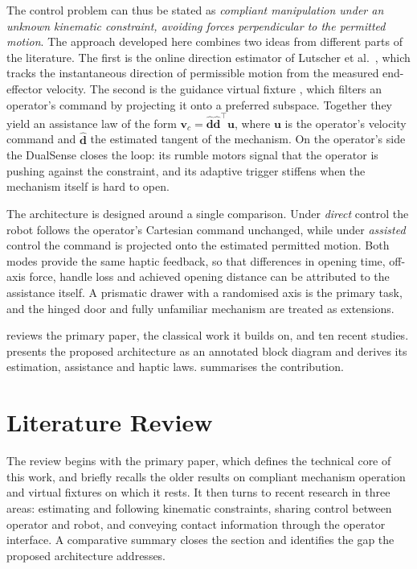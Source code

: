 \documentclass[11pt,letterpaper]{article}
\newcommand{\vect}[1]{\bm{#1}}
\newcommand{\vuser}{\vect{u}}
\newcommand{\vcmd}{\vect{v}_{c}}
\begin{document}
The control problem can thus be stated as \emph{compliant manipulation under an unknown kinematic constraint, avoiding forces perpendicular to the permitted motion}. The approach developed here combines two ideas from different parts of the literature. The first is the online direction estimator of Lutscher et al.\ \cite{lutscher2010control}, which tracks the instantaneous direction of permissible motion from the measured end-effector velocity. The second is the guidance virtual fixture \cite{rosenberg1993virtual,marayong2003spatial,abbott2003architectures}, which filters an operator's command by projecting it onto a preferred subspace. Together they yield an assistance law of the form $\vcmd = \hat{\vect{d}}\hat{\vect{d}}^{\top}\vuser$, where $\vuser$ is the operator's velocity command and $\hat{\vect{d}}$ the estimated tangent of the mechanism. On the operator's side the DualSense closes the loop: its rumble motors signal that the operator is pushing against the constraint, and its adaptive trigger stiffens when the mechanism itself is hard to open.

The architecture is designed around a single comparison. Under \emph{direct} control the robot follows the operator's Cartesian command unchanged, while under \emph{assisted} control the command is projected onto the estimated permitted motion. Both modes provide the same haptic feedback, so that differences in opening time, off-axis force, handle loss and achieved opening distance can be attributed to the assistance itself. A prismatic drawer with a randomised axis is the primary task, and the hinged door and fully unfamiliar mechanism are treated as extensions.

 reviews the primary paper, the classical work it builds on, and ten recent studies.  presents the proposed architecture as an annotated block diagram and derives its estimation, assistance and haptic laws.  summarises the contribution.

\section{Literature Review}
\label{sec:litreview}

The review begins with the primary paper, which defines the technical core of this work, and briefly recalls the older results on compliant mechanism operation and virtual fixtures on which it rests. It then turns to recent research in three areas: estimating and following kinematic constraints, sharing control between operator and robot, and conveying contact information through the operator interface. A comparative summary closes the section and identifies the gap the proposed architecture addresses.
\end{document}
